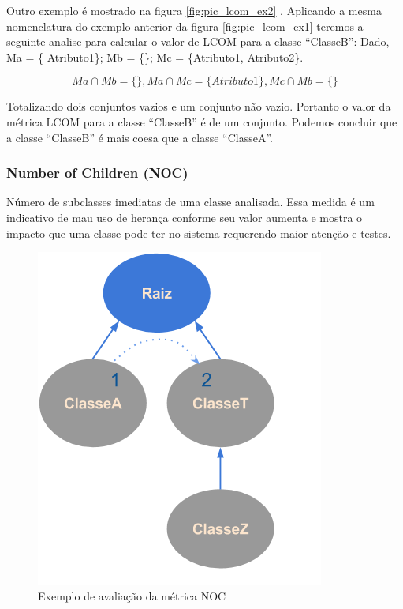 \documentclass[conference]{IEEEtran}
\begin{document}
Outro exemplo é mostrado na figura \ref{fig:pic_lcom_ex2} . Aplicando a mesma
nomenclatura do exemplo anterior da figura \ref{fig:pic_lcom_ex1} teremos a
seguinte analise para calcular o valor de LCOM para a classe ``ClasseB'': Dado,
Ma = \{ Atributo1\}; Mb = \{\}; Mc = \{Atributo1, Atributo2\}. 

\[
Ma \cap Mb = \{ \},
Ma \cap Mc = \{ Atributo1 \},
Mc \cap Mb = \{ \}
\]

Totalizando dois conjuntos vazios e um conjunto não vazio. Portanto o valor da
métrica LCOM para a classe ``ClasseB'' é de um conjunto. Podemos concluir que a
classe ``ClasseB'' é mais coesa que  a classe ``ClasseA''.

\subsubsection{\textbf{Number of Children (NOC)}} Número de subclasses imediatas
de uma classe analisada. Essa medida é um indicativo de mau uso de herança conforme seu
valor aumenta e mostra o impacto que uma classe pode ter no sistema requerendo maior
atenção e testes.

\begin{figure}[htb]
	\begin{center}
		\includegraphics[scale=0.6]{img/pic_noc.png}
	\end{center}
	\caption{\label{fig:pic_noc}Exemplo de avaliação da métrica NOC}
	
\end{figure}
\end{document}
